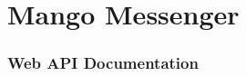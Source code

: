 \chapter{Mango Messenger}\label{ch:mango-messenger}

\subsection{Web API Documentation}\label{subsec:web-api-documentation}